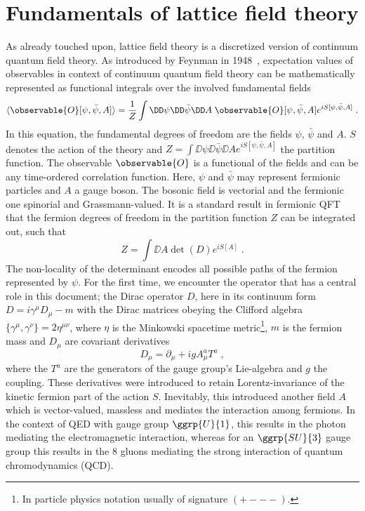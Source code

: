 \section{Fundamentals of lattice field theory}

As already touched upon, lattice field theory is a discretized version of continuum quantum field theory.
As introduced by Feynman in 1948~\cite{Feynman1948}, expectation values of observables in context of continuum quantum field theory can be mathematically represented as functional integrals over the involved fundamental fields
\begin{equation} \label{eq:path:integral:expectation:value}
\langle \observable{O}[\psi, \bar{\psi}, A] \rangle =
\frac{1}{Z} \int
\DD \psi
\DD \bar{\psi}
\DD A \;
\observable{O}[\psi, \bar{\psi}, A]
e^{i S[\psi, \bar{\psi}, A]} \;.
\end{equation}
In this equation, the fundamental degrees of freedom are the fields $\psi$, $\bar{\psi}$ and $A$.
$S$ denotes the action of the theory and $Z = \int \DD \psi \DD \bar{\psi} \DD A e^{i S[\psi, \bar{\psi}, A]}$ the partition function.
The observable $\observable{O}$ is a functional of the fields and can be any time-ordered correlation function.
Here, $\psi$ and $\bar{\psi}$ may represent fermionic particles and $A$ a gauge boson.
The bosonic field is vectorial and the fermionic one spinorial and Grassmann-valued.
It is a standard result in fermionic QFT that the fermion degrees of freedom in the partition function $Z$ can be integrated out, such that
\begin{equation}
Z = \int \DD A \det(D) e^{i S[A]} \;.
\end{equation}
The non-locality of the determinant encodes all possible paths of the fermion represented by $\psi$.
For the first time, we encounter the operator that has a central role in this document; the Dirac operator $D$, here in its continuum form $D = i \gamma^{\mu} D_{\mu} - m$ with the Dirac matrices obeying the Clifford algebra $\{\gamma^{\mu}, \gamma^{\nu}\} = 2 \eta^{\mu \nu}$, where $\eta$ is the Minkowski spacetime metric\footnote{In particle physics notation usually of signature $(+---)$.}, $m$ is the fermion mass and $D_{\mu}$ are covariant derivatives
\begin{equation}
D_{\mu} = \partial_{\mu} + ig A_{\mu}^{a} T^{a} \;,
\end{equation}
where the $T^{a}$ are the generators of the gauge group's Lie-algebra and $g$ the coupling.
These derivatives were introduced to retain Lorentz-invariance of the kinetic fermion part of the action $S$.
Inevitably, this introduced another field $A$ which is vector-valued, massless and mediates the interaction among fermions.
In the context of QED with gauge group $\ggrp{U}{1}$, this results in the photon mediating the electromagnetic interaction, whereas for an $\ggrp{SU}{3}$ gauge group this results in the \num{8} gluons mediating the strong interaction of quantum chromodynamics (QCD).

